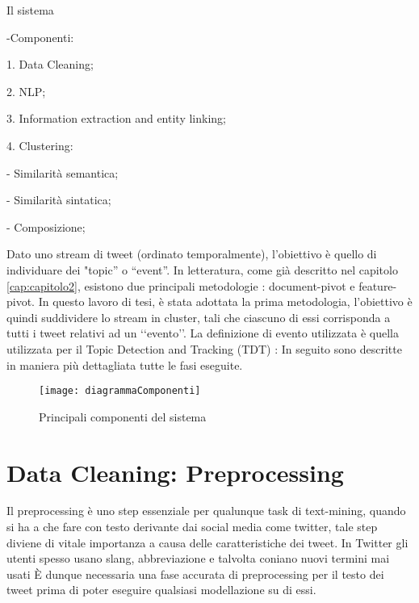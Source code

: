 

\color{red}
Il sistema

-Componenti:

1. Data Cleaning;

2. NLP;

3. Information extraction and entity linking;

4. Clustering:

	- Similarità semantica;
	
    - Similarità sintatica;
   
    - Composizione;
 			

\color{black}

Dato uno stream  di tweet (ordinato temporalmente), l'obiettivo  è quello di individuare dei "topic” o “event”. In letteratura, come già descritto nel capitolo \ref{cap:capitolo2}, esistono due principali metodologie : document-pivot e feature-pivot.
In questo lavoro di tesi, è stata adottata la prima metodologia, l'obiettivo è quindi suddividere lo stream in cluster, tali che ciascuno di essi corrisponda a tutti i tweet relativi ad un \lq\lq evento\rq\rq.  
La definizione di evento utilizzata è quella utilizzata per il Topic Detection and Tracking (TDT) \cite{Allan:2002:TDT:772260} :
In seguito sono descritte in maniera più dettagliata tutte le fasi eseguite.
\begin{figure}[h]
    \centering
    \texttt{[image: diagrammaComponenti]}
    \caption{Principali componenti del sistema}
    \label{fig:diagrammaComponentiSistema}
\end{figure} 


\section{Data Cleaning: Preprocessing}

Il preprocessing è uno step essenziale per qualunque task di text-mining, quando si ha a che fare con testo derivante dai social media come twitter, tale step diviene di vitale importanza a causa delle caratteristiche dei tweet. In Twitter gli utenti spesso usano slang, abbreviazione e talvolta coniano nuovi termini mai usati 
\`E dunque necessaria una fase accurata di preprocessing per il testo dei tweet prima di poter eseguire qualsiasi modellazione su di essi. 


